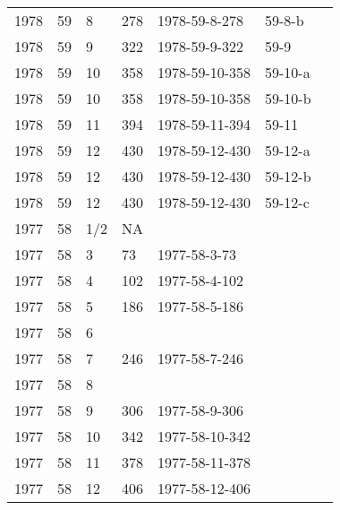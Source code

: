 \begin{longtable}{ |l|l|l|l|p{2.7cm}|l|p{2cm}| }
 1978 & 59 &     8 &     278 & 1978-59-8-278  & 59-8-b & \\
 1978 & 59 &     9 &     322 & 1978-59-9-322  & 59-9  & \\
 1978 & 59 &    10 &     358 & 1978-59-10-358 & 59-10-a & \\
 1978 & 59 &    10 &     358 & 1978-59-10-358 & 59-10-b & \\
 1978 & 59 &    11 &     394 & 1978-59-11-394 & 59-11 & \\
 1978 & 59 &    12 &     430 & 1978-59-12-430 & 59-12-a & \\
 1978 & 59 &    12 &     430 & 1978-59-12-430 & 59-12-b & \\
 1978 & 59 &    12 &     430 & 1978-59-12-430 & 59-12-c & \\
 1977 & 58 &   1/2 &      NA &                &  &  \\
 1977 & 58 &     3 &      73 & 1977-58-3-73   &  & \\
 1977 & 58 &     4 &     102 & 1977-58-4-102  &  & \\
 1977 & 58 &     5 &     186 & 1977-58-5-186  &  & \\
 1977 & 58 &     6 &         &                &  & \\
 1977 & 58 &     7 &     246 & 1977-58-7-246  &  & \\
 1977 & 58 &     8 &         &                &  & \\
 1977 & 58 &     9 &     306 & 1977-58-9-306  &  & \\
 1977 & 58 &    10 & 342     & 1977-58-10-342 &  & \\
 1977 & 58 &    11 &   378   & 1977-58-11-378 &  & \\
 1977 & 58 &    12 &    406  & 1977-58-12-406 &  & \\
\end{longtable}
